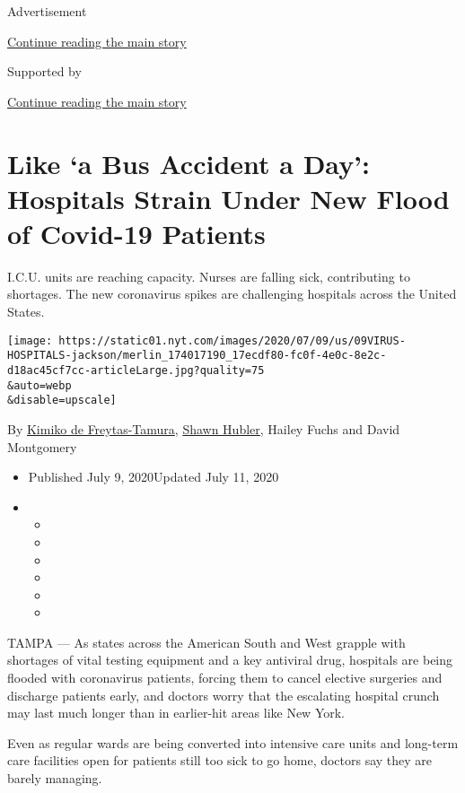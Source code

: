 Advertisement

\protect\hyperlink{after-top}{Continue reading the main story}

Supported by

\protect\hyperlink{after-sponsor}{Continue reading the main story}

\hypertarget{like-a-bus-accident-a-day-hospitals-strain-under-new-flood-of-covid-19-patients}{%
\section{Like `a Bus Accident a Day': Hospitals Strain Under New Flood
of Covid-19
Patients}\label{like-a-bus-accident-a-day-hospitals-strain-under-new-flood-of-covid-19-patients}}

I.C.U. units are reaching capacity. Nurses are falling sick,
contributing to shortages. The new coronavirus spikes are challenging
hospitals across the United States.

\texttt{[image: https://static01.nyt.com/images/2020/07/09/us/09VIRUS-HOSPITALS-jackson/merlin\_174017190\_17ecdf80-fc0f-4e0c-8e2c-d18ac45cf7cc-articleLarge.jpg?quality=75\\\&auto=webp\\\&disable=upscale]}

By \href{https://www.nytimes.com/by/kimiko-de-freytas-tamura}{Kimiko de
Freytas-Tamura}, \href{https://www.nytimes.com/by/shawn-hubler}{Shawn
Hubler}, Hailey Fuchs and David Montgomery

\begin{itemize}
\item
  Published July 9, 2020Updated July 11, 2020
\item
  \begin{itemize}
  \item
  \item
  \item
  \item
  \item
  \item
  \end{itemize}
\end{itemize}

TAMPA --- As states across the American South and West grapple with
shortages of vital testing equipment and a key antiviral drug, hospitals
are being flooded with coronavirus patients, forcing them to cancel
elective surgeries and discharge patients early, and doctors worry that
the escalating hospital crunch may last much longer than in earlier-hit
areas like New York.

Even as regular wards are being converted into intensive care units and
long-term care facilities open for patients still too sick to go home,
doctors say they are barely managing.

